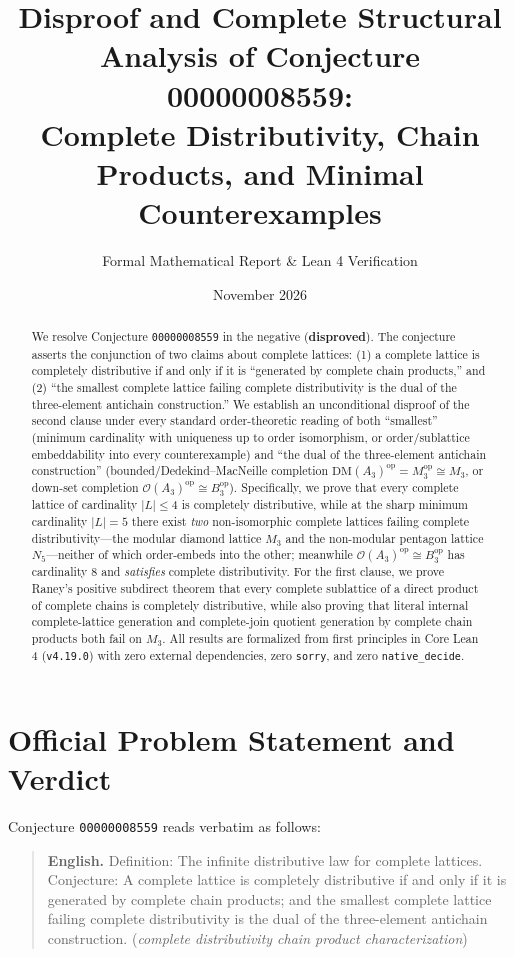 \documentclass[11pt,a4paper]{article}
\title{\textbf{Disproof and Complete Structural Analysis of Conjecture 00000008559:\\
Complete Distributivity, Chain Products, and Minimal Counterexamples}}
\author{Formal Mathematical Report \& Lean 4 Verification}
\date{November 2026}
\theoremstyle{plain}
\theoremstyle{definition}
\newcommand{\op}{\mathrm{op}}
\newcommand{\DM}{\mathrm{DM}}
\newcommand{\Down}{\mathcal{O}}
\begin{document}
\maketitle

\begin{abstract}
We resolve Conjecture \texttt{00000008559} in the negative (\textbf{disproved}).
The conjecture asserts the conjunction of two claims about complete lattices:
(1) a complete lattice is completely distributive if and only if it is ``generated by
complete chain products,'' and (2) ``the smallest complete lattice failing complete
distributivity is the dual of the three-element antichain construction.''
We establish an unconditional disproof of the second clause under every standard
order-theoretic reading of both ``smallest'' (minimum cardinality with uniqueness up to
order isomorphism, or order/sublattice embeddability into every counterexample) and
``the dual of the three-element antichain construction'' (bounded/Dedekind--MacNeille
completion $\DM(A_3)^{\op} = M_3^{\op} \cong M_3$, or down-set completion
$\Down(A_3)^{\op} \cong B_3^{\op}$). Specifically, we prove that every complete lattice
of cardinality $|L| \le 4$ is completely distributive, while at the sharp minimum
cardinality $|L| = 5$ there exist \emph{two} non-isomorphic complete lattices failing
complete distributivity---the modular diamond lattice $M_3$ and the non-modular pentagon
lattice $N_5$---neither of which order-embeds into the other; meanwhile
$\Down(A_3)^{\op} \cong B_3^{\op}$ has cardinality $8$ and \emph{satisfies} complete
distributivity. For the first clause, we prove Raney's positive subdirect theorem that
every complete sublattice of a direct product of complete chains is completely
distributive, while also proving that literal internal complete-lattice generation and
complete-join quotient generation by complete chain products both fail on $M_3$.
All results are formalized from first principles in Core Lean 4 (\texttt{v4.19.0})
with zero external dependencies, zero \texttt{sorry}, and zero \texttt{native\_decide}.
\end{abstract}

\section{Official Problem Statement and Verdict}

Conjecture \texttt{00000008559} reads verbatim as follows:

\begin{quote}
\textbf{English.} Definition: The infinite distributive law for complete lattices.
Conjecture: A complete lattice is completely distributive if and only if it is generated
by complete chain products; and the smallest complete lattice failing complete
distributivity is the dual of the three-element antichain construction.
(\emph{complete distributivity chain product characterization})
\end{quote}
\end{document}
